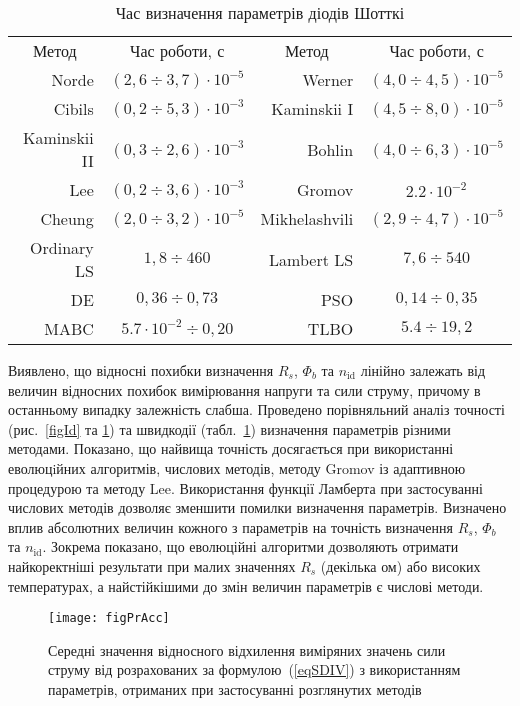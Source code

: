 \begin{table}[b]
\caption{\label{tabRT}Час визначення параметрів діодів Шотткі}
\centering
\begin{tabular}{|r|c|r|c|}
\hline
\multicolumn{1}{|c|}{Метод}&Час роботи, с &\multicolumn{1}{c|}{Метод}&Час роботи, с\\ \hhline{|====|}
Norde &$(2,6\div3,7)\cdot10^{-5}$& Werner  &$(4,0\div4,5)\cdot10^{-5}$\\ \hline
Cibils  &$(0,2\div5,3)\cdot10^{-3}$& Kaminskii I &$(4,5\div8,0)\cdot10^{-5}$\\ \hline
Kaminskii II &$(0,3\div2,6)\cdot10^{-3}$& Bohlin &$(4,0\div6,3)\cdot10^{-5}$\\ \hline
Lee &$(0,2\div3,6)\cdot10^{-3}$& Gromov &$2.2\cdot10^{-2}$\\ \hline
Cheung &$(2,0\div3,2)\cdot10^{-5}$&Mikhelashvili &$(2,9\div4,7)\cdot10^{-5}$\\ \hline
Ordinary LS &$1,8\div460$&Lambert LS &$7,6\div540$\\ \hline
DE &$0,36\div0,73$&PSO &$0,14\div0,35$\\ \hline
MABC &$5.7\cdot10^{-2}\div0,20$&TLBO &$5.4\div19,2$ \\
\hline
\end{tabular}
\end{table}

Виявлено, що
відносні похибки визначення $R_s$, $\Phi_b$ та $n_\mathrm{id}$ лінійно залежать від величин відносних похибок вимірювання напруги та сили струму, причому в останньому випадку залежність слабша.
Проведено порівняльний аналіз точності (рис.~\ref{figId} та \ref{figPrAcc}) та швидкодії (табл.~\ref{tabRT}) визначення параметрів різними методами.
Показано, що найвища точність досягається при використанні еволюцiйних алгоритмів, числових методів, методу Gromov із адаптивною процедурою та методу Lee.
Використання функції Ламберта при застосуванні числових методів дозволяє зменшити помилки визначення параметрів.
Визначено вплив абсолютних величин кожного з параметрів на точність визначення $R_s$, $\Phi_b$ та $n_\mathrm{id}$.
Зокрема показано, що еволюційні алгоритми дозволяють отримати найкоректніші результати при малих значеннях $R_s$ (декілька ом) або високих температурах, а найстійкішими до змін величин параметрів є числові методи.
\begin{figure}[ht]
\center
\texttt{[image: figPrAcc]}%
\caption{\label{figPrAcc}
Середні значення відносного відхилення виміряних значень сили струму від розрахованих за формулою~(\ref{eqSDIV}) з використанням параметрів, отриманих при застосуванні розглянутих методів
}
\end{figure}






